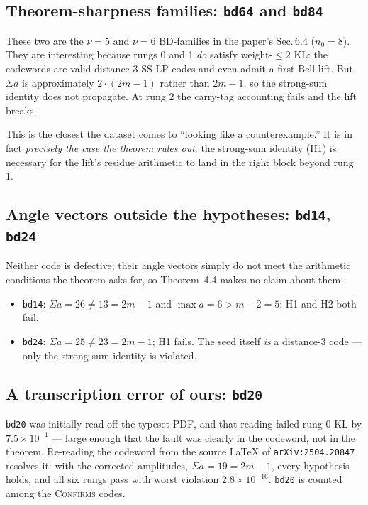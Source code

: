\documentclass[11pt]{article}
\newcommand{\vCONF}{\textcolor{cConfirm}{\textsc{Confirms}}}
\newcommand{\enot}[2]{\ensuremath{#1\!\times\!10^{#2}}}
\begin{document}
\subsection{Theorem-sharpness families: \texttt{bd64} and \texttt{bd84}}

These two are the $\nu=5$ and $\nu=6$ BD-families in the paper's Sec.\,6.4
($n_0=8$). They are interesting because rungs 0 and 1 \emph{do} satisfy
weight-$\le2$ KL: the codewords are valid distance-3 SS-LP codes and even
admit a first Bell lift. But $\Sigma a$ is approximately $2\cdot(2m{-}1)$
rather than $2m{-}1$, so the strong-sum identity does not propagate. At
rung 2 the carry-tag accounting fails and the lift breaks.

This is the closest the dataset comes to ``looking like a counterexample.''
It is in fact \emph{precisely the case the theorem rules out}: the strong-sum
identity (H1) is necessary for the lift's residue arithmetic to land in the
right block beyond rung 1.

\subsection{Angle vectors outside the hypotheses: \texttt{bd14}, \texttt{bd24}}

Neither code is defective; their angle vectors simply do not meet the
arithmetic conditions the theorem asks for, so Theorem~4.4 makes no claim
about them.

\begin{itemize}[leftmargin=2em]
\item \texttt{bd14}: $\Sigma a = 26 \ne 13 = 2m{-}1$ and
$\max a = 6 > m{-}2 = 5$; H1 and H2 both fail.
\item \texttt{bd24}: $\Sigma a = 25 \ne 23 = 2m{-}1$; H1 fails. The seed
itself \emph{is} a distance-3 code --- only the strong-sum identity is
violated.
\end{itemize}

\subsection{A transcription error of ours: \texttt{bd20}}

\texttt{bd20} was initially read off the typeset PDF, and that reading failed
rung-0 KL by $\enot{7.5}{-1}$ --- large enough that the fault was clearly in
the codeword, not in the theorem. Re-reading the codeword from the source
\LaTeX{} of \texttt{arXiv:2504.20847} resolves it: with the corrected
amplitudes, $\Sigma a = 19 = 2m{-}1$, every hypothesis holds, and all six
rungs pass with worst violation $\enot{2.8}{-16}$. \texttt{bd20} is counted
among the \vCONF{} codes.
\end{document}
